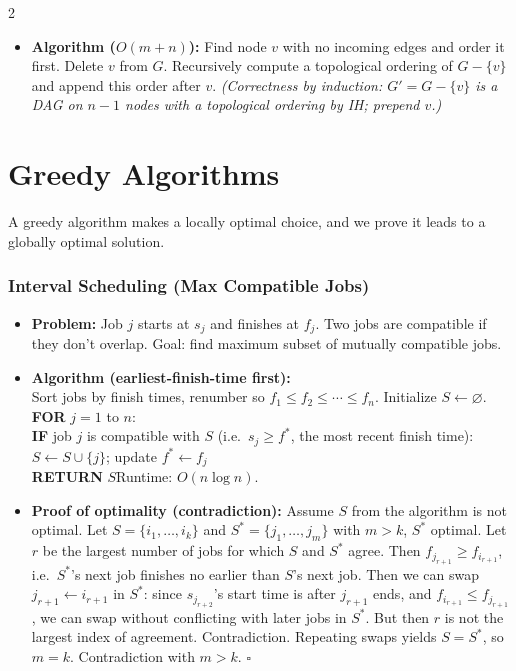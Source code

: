 \documentclass[9pt]{article}
\begin{document}
\begin{multicols}{2}
\begin{itemize}
  \item \textbf{Algorithm ($O(m+n)$):} Find node $v$ with no incoming edges and order it first. Delete $v$ from $G$. Recursively compute a topological ordering of $G-\{v\}$ and append this order after $v$. \textit{(Correctness by induction: $G'=G-\{v\}$ is a DAG on $n-1$ nodes with a topological ordering by IH; prepend $v$.)}
\end{itemize}

\section*{Greedy Algorithms}

A greedy algorithm makes a locally optimal choice, and we prove it leads to a globally optimal solution.

\subsubsection*{Interval Scheduling (Max Compatible Jobs)}

\begin{itemize}
  \item \textbf{Problem:} Job $j$ starts at $s_j$ and finishes at $f_j$. Two jobs are compatible if they don't overlap. Goal: find maximum subset of mutually compatible jobs.
  \item \textbf{Algorithm (earliest-finish-time first):}\\
  Sort jobs by finish times, renumber so $f_1\le f_2\le\cdots\le f_n$. Initialize $S\leftarrow\varnothing$.\\
  \textbf{FOR} $j=1$ to $n$:\\
  \hspace*{8pt}\textbf{IF} job $j$ is compatible with $S$ (i.e.\ $s_j\ge f^*$, the most recent finish time):\\
  \hspace*{16pt}$S\leftarrow S\cup\{j\}$; update $f^*\leftarrow f_j$\\
  \textbf{RETURN} $S$\quad Runtime: $O(n\log n)$.
  \item \textbf{Proof of optimality (contradiction):} Assume $S$ from the algorithm is not optimal. Let $S=\{i_1,\dots,i_k\}$ and $S^*=\{j_1,\dots,j_m\}$ with $m>k$, $S^*$ optimal. Let $r$ be the largest number of jobs for which $S$ and $S^*$ agree. Then $f_{j_{r+1}}\ge f_{i_{r+1}}$, i.e.\ $S^*$'s next job finishes no earlier than $S$'s next job. Then we can swap $j_{r+1}\leftarrow i_{r+1}$ in $S^*$: since $s_{j_{r+2}}$'s start time is after $j_{r+1}$ ends, and $f_{i_{r+1}}\le f_{j_{r+1}}$, we can swap without conflicting with later jobs in $S^*$. But then $r$ is not the largest index of agreement. Contradiction. Repeating swaps yields $S=S^*$, so $m=k$. Contradiction with $m>k$. $\square$
\end{itemize}


\end{multicols}
\end{document}
